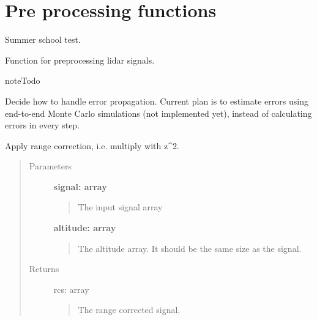 \documentclass[letterpaper,10pt,english]{sphinxmanual}
\begin{document}
\chapter{Pre processing functions}
\label{pre_processing:pre-processing-functions}\label{pre_processing::doc}\label{pre_processing:module-pre_processing}
Summer school test.

Function for preprocessing lidar signals.

\begin{notice}{note}{Todo}

Decide how to handle error propagation. Current plan is to estimate errors using end-to-end Monte Carlo
simulations (not implemented yet), instead of  calculating errors in every step.
\end{notice}

\begin{fulllineitems}
\label{pre_processing:pre_processing.apply_range_correction}
Apply range correction, i.e. multiply with z\textasciicircum{}2.
\begin{quote}\begin{description}
\item[{Parameters}] \leavevmode
\textbf{signal: array}
\begin{quote}

The input signal array
\end{quote}

\textbf{altitude: array}
\begin{quote}

The altitude array. It should be the same size as the signal.
\end{quote}

\item[{Returns}] \leavevmode
rcs: array
\begin{quote}

The range corrected signal.
\end{quote}

\end{description}\end{quote}

\end{fulllineitems}

\end{document}
